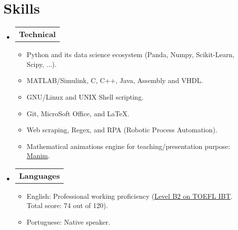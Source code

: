 \section{Skills}

\begin{itemize}[leftmargin=0.15in, label={}] %
  \item   \begin{tabular*}{0.2\textwidth}{l} \textbf{Technical} \end{tabular*}\vspace{-7pt} %
          \begin{itemize} %
            \item Python and its data science ecosystem (Panda, Numpy, Scikit-Learn, Scipy, ...).
            \item MATLAB/Simulink, C, C++, Java, Assembly and VHDL. %
            \item GNU/Linux and UNIX Shell scripting.
            \item Git, MicroSoft Office, and \LaTeX.
            \item Web scraping, Regex, and RPA (Robotic Process Automation).
            \item Mathematical animations engine for teaching/presentation purpose: \href{https://github.com/ManimCommunity/manim}{Manim}.
          \end{itemize}\vspace{-5pt}
  \item   \begin{tabular*}{0.2\textwidth}{l} \textbf{Languages} \end{tabular*}\vspace{-6pt} %
          \begin{itemize}
            \item English: Professional working proficiency (\href{http://raw.githubusercontent.com/tapyu/tapyu/master/cv/Latex/figs/Toefl.pdf}{Level B2 on TOEFL IBT}. Total score: 74 out of 120).
            \item Portuguese: Native speaker.
          \end{itemize}
\end{itemize} %